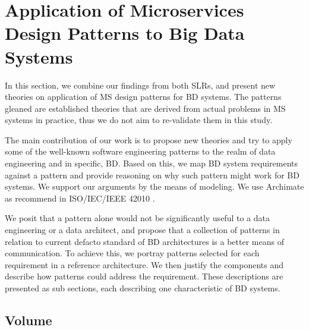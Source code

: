 \documentclass{bmcart}
\begin{document}

\section{Application of Microservices Design Patterns to Big Data Systems} \label{Mapping}


In this section, we combine our findings from both SLRs, and present new theories on application of MS design patterns for BD systems. The patterns gleaned are established theories that are derived from actual problems in MS systems in practice, thus we do not aim to re-validate them in this study. 

The main contribution of our work is to propose new theories and try to apply some of the well-known software engineering patterns to the realm of data engineering and in specific, BD. Based on this, we map BD system requirements against a pattern and provide reasoning on why such pattern might work for BD systems. We support our arguments by the means of modeling. We use Archimate \cite{lankhorst2013language} as recommend in ISO/IEC/IEEE 42010 \cite{Chaabane}. 


We posit that a pattern alone would not be significantly useful to a data engineering or a data architect, and propose that a collection of patterns in relation to current defacto standard of BD architectures is a better means of communication. To achieve this, we portray patterns selected for each requirement in a reference architecture. We then justify the components and describe how patterns could address the requirement. These descriptions are presented as sub sections, each describing one characteristic of BD systems. 


\subsection{Volume} \label{volume}

\end{document}
